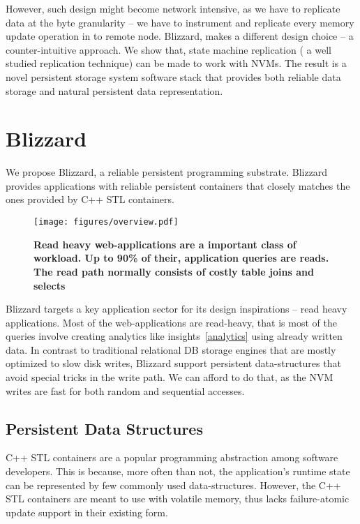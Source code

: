 However, such design might become network intensive, as we have to replicate data at the byte
granularity -- we have to instrument and replicate every memory update operation in to remote node.
Blizzard, makes a different design choice -- a counter-intuitive approach. We show that, state 
machine replication ( a well studied replication technique) can be made to work with NVMs. 
The result is a novel persistent storage system software stack that provides both reliable data
storage and natural persistent data representation.

\section{Blizzard}
We propose Blizzard, a reliable persistent programming substrate. Blizzard provides applications
with reliable persistent containers that closely matches the ones provided by C++ STL containers.

\begin{figure}[tbp]   
	\centering
	\texttt{[image: figures/overview.pdf]} 
	\caption{\bf Read heavy web-applications are a important class of workload. Up to 90\% of their,
	application queries are reads. The read path normally consists of costly table joins and selects} 
	\label{analytics} 
\end{figure}

Blizzard targets a key application sector for its design inspirations -- read heavy applications.
Most of the web-applications are read-heavy, that is most of the queries involve creating 
analytics like insights~\autoref{analytics} using already written data. In contrast to 
traditional relational DB storage engines that are mostly optimized to slow disk writes,
Blizzard support persistent data-structures that avoid special tricks in the write path. We 
can afford to do that, as the NVM writes are fast for both random and sequential accesses.


\subsection{Persistent Data Structures}

C++ STL containers are a popular programming abstraction among software developers. This is because,
more often than not, the application's runtime state can be represented by few commonly used 
data-structures.  However, the C++ STL containers are meant to use with volatile memory, thus
lacks failure-atomic update support in their existing form.

